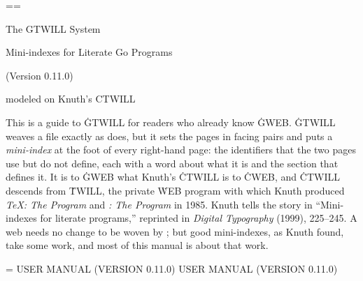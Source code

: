 \def\begincode{\par\medskip\begingroup
  \def\do##1{\catcode`##1=12 }\dospecials
  \catcode`\|=0 \def\par{\endgraf\nobreak}%
  \obeylines \obeyspaces \tentt\tentz \parindent=0pt \leftskip=\parindent\relax}
\def\endcode{\endgroup\medskip\noindent}

\def\sampleentry#1{\hbox{#1}}
\def\samplemini#1#2#3{\par\medskip
  \hrule\kern4pt
  \hbox to\hsize{\eightrm \def\it{\eightit}\def\bf{\eightbf}\let\tt=\eighttt
    \baselineskip=9pt \vtop{#1}\hfil\vtop{#2}\hfil\vtop{#3}}%
  \medskip\noindent}

\def\runninghead{{\ninett GTWILL} USER MANUAL (VERSION 0.11.0)}
\def\lheader{\mainfont\folio\hfil{\sc\runninghead}\hfil}
\def\rheader{\hfil{\sc\runninghead}\hfil\mainfont\folio}

\headline={\hfil}\footline={\hfil}
\null\vfill
\centerline{\titlefont The {\ttitlefont GTWILL} System}
\vskip 6pt
\centerline{\sectionfont Mini-indexes for Literate Go Programs}
\vskip 18pt
\centerline{(Version 0.11.0)}
\vskip 24pt
\centerline{\authorfont modeled on Knuth's {\ttitlefont CTWILL}}
\vfill
\noindent
This is a guide to \.{GTWILL} for readers who already know \.{GWEB}. \.{GTWILL}
weaves a  file exactly as  does, but it sets the pages in
facing pairs and puts a {\it mini-index\/} at the foot of every right-hand page:
the identifiers that the two pages use but do not define, each with a word about
what it is and the section that defines it. It is to \.{GWEB} what Knuth's
\.{CTWILL} is to \.{CWEB}, and \.{CTWILL} descends from \.{TWILL}, the private
\.{WEB} program with which Knuth produced {\sl \TeX: The Program\/} and {\sl
\slMF: The Program\/} in 1985. Knuth tells the story in
``Mini-indexes for literate programs,'' reprinted in {\sl Digital
Typography\/} (1999), 225--245. A web needs no change to be woven by
; but good mini-indexes, as Knuth found, take some work, and most of
this manual is about that work.
\vfil\eject

\headline={\ifodd\pageno\rheader\else\lheader\fi}


